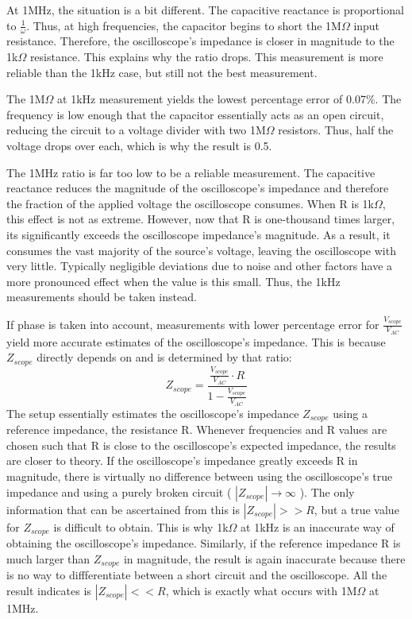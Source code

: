 At 1MHz, the situation is a bit different. The capacitive reactance is proportional to $\frac{1}{\omega}$. Thus, at high frequencies, the capacitor begins to short the 1M$\Omega$ input resistance. Therefore, the oscilloscope's impedance is closer in magnitude to the 1k$\Omega$ resistance. This explains why the ratio drops. This measurement is more reliable than the 1kHz case, but still not the best measurement.

The 1M$\Omega$ at 1kHz measurement yields the lowest percentage error of 0.07\%. The frequency is low enough that the capacitor essentially acts as an open circuit, reducing the circuit to a voltage divider with two 1M$\Omega$ resistors. Thus, half the voltage drops over each, which is why the result is 0.5.

The 1MHz ratio is far too low to be a reliable measurement. The capacitive reactance reduces the magnitude of the oscilloscope's impedance and therefore the fraction of the applied voltage the oscilloscope consumes. When R is 1k$\Omega$, this effect is not as extreme. However, now that R is one-thousand times larger, its significantly exceeds the oscilloscope impedance's magnitude. As a result, it consumes the vast majority of the source's voltage, leaving the oscilloscope with very little. Typically negligible deviations due to noise and other factors have a more pronounced effect when the value is this small. Thus, the 1kHz measurements should be taken instead.

If phase is taken into account, measurements with lower percentage error for $\frac{V_{scope}}{V_{AC}}$ yield more accurate estimates of the oscilloscope's impedance. This is because $Z_{scope}$ directly depends on and is determined by that ratio:
\begin{equation}
\label{eq:zscope}
Z_{scope} = \frac{\frac{V_{scope}}{V_{AC}} \cdot R }{1 - \frac{V_{scope}}{V_{AC}}}
\end{equation}
The setup essentially estimates the oscilloscope's impedance $Z_{scope}$ using a reference impedance, the resistance R. Whenever frequencies and R values are chosen such that R is close to the oscilloscope's expected impedance, the results are closer to theory. If the oscilloscope's impedance greatly exceeds R in magnitude, there is virtually no difference between using the oscilloscope's true impedance and using a purely broken circuit ( $|Z_{scope}| \rightarrow \infty$ ). The only information that can be ascertained from this is $|Z_{scope}| >> R$, but a true value for $Z_{scope}$ is difficult to obtain. This is why 1k$\Omega$ at 1kHz is an inaccurate way of obtaining the oscilloscope's impedance.
Similarly, if the reference impedance R is much larger than $Z_{scope}$ in magnitude, the result is again inaccurate because there is no way to diffferentiate between a short circuit and the oscilloscope. All the result indicates is $|Z_{scope}| << R$, which is exactly what occurs with 1M$\Omega$ at 1MHz.
